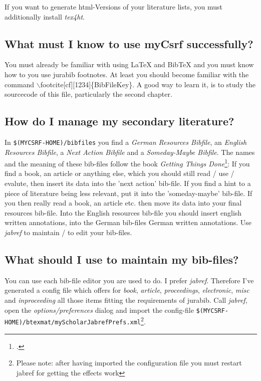 \documentclass[DIV=calc,BCOR=5mm,11pt,headings=small,oneside,abstract=true, toc=bib]{scrartcl}
\begin{document}
If you want to generate html-Versions of your literature lists, you must
additionally install \textit{tex4ht}.

\subsection{What must I know to use myCsrf successfully?}
You must already be familiar with using LaTeX and BibTeX and you must know how
to you use jurabib footnotes. At least you should become familiar with the
command $\backslash$footcite[cf][1234]\{BibFileKey\}. A good way to learn it, is to
study the sourcecode of this file, particularly the second chapter.

\subsection{How do I manage my secondary literature?}
In \texttt{\$(MYCSRF-HOME)/bibfiles} you find a \textit{German Resources
Bibfile}, an \textit{English Resources Bibfile}, a \textit{Next Action Bibfile}
and a \textit{Someday-Maybe Bibfile}. The names and the meaning of these
bib-files follow the book \textit{Getting Things Done}\footcite[cf.][36 et
passim]{Allen2001a}: If you find a book, an article or anything else, which you
should still read / use / evalute, then insert its data into the 'next action'
bib-file. If you find a hint to a piece of literature being less relevant, put
it into the 'someday-maybe' bib-file. If you then really read a book, an article
etc. then move its data into your final resources bib-file. Into the English
resources bib-file you should insert english written annotations, into the
German bib-files German written annotations. Use \textit{jabref} to maintain /
to edit your bib-files.

\subsection{What should I use to maintain my bib-files?}
You can use each bib-file editor you are used to do. I prefer \textit{jabref}.
There\-fo\-re I've generated a config file which offers for \textit{book},
\textit{article}, \textit{proceedings}, \textit{elec\-tro\-nic}, \textit{misc}
and \textit{inproceeding} all those items fitting the requirements of jurabib. Call
\textit{jabref}, open the \textit{options/preferences} dialog and import the
config-file
\texttt{\$(MYCSRF-HOME)/btexmat/myScholarJabrefPrefs.xml}\footnote{Please
note: after having imported the configuration file you must restart jabref for
getting the effects work}.
\end{document}
